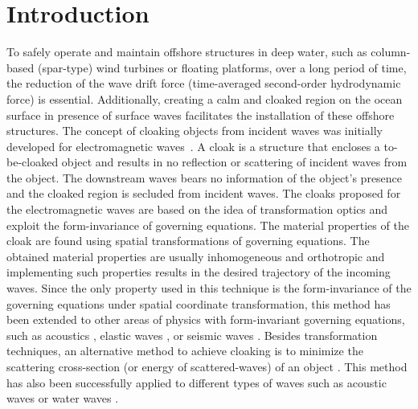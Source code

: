 \documentclass{jfm}
\begin{document}


\section{Introduction}
\label{intr}



{To safely operate and maintain offshore structures in deep water, such as column-based (spar-type) wind turbines or floating platforms, over a long period of time, the reduction of the wave drift force (time-averaged second-order hydrodynamic force) is essential. Additionally, creating a calm and cloaked region on the ocean surface in presence of surface waves facilitates the installation of these offshore structures. 
The concept of cloaking objects from incident waves was initially developed for electromagnetic waves~\cite[]{Pendry2006, Schurig2006}. A cloak is a structure that encloses a to-be-cloaked object and results in no reflection or scattering of incident waves from the object. The downstream waves bears no information of the object's presence and the cloaked region is secluded from incident waves. The cloaks proposed for the electromagnetic waves are based on the idea of transformation optics and exploit the form-invariance of governing equations. The material properties of the cloak are found using spatial transformations of governing equations. The obtained material properties are usually inhomogeneous and orthotropic and implementing such properties results in the desired trajectory of the incoming waves. Since the only property used in this technique is the form-invariance of the governing equations under spatial coordinate transformation, this method has been extended to other areas of physics with form-invariant governing equations, such as acoustics \cite[]{Cummer2007, Chen2007, Huang2014,zareei2018continuous,darabi2018broadband}, elastic waves \cite[]{Farhat2009, Stenger2012,darabi2018experimental,zareei2017broadband}, or seismic waves \cite[]{Brule2014}. Besides transformation techniques, an alternative method to achieve cloaking is to minimize the scattering cross-section (or energy of scattered-waves) of an object \cite[]{alu2005achieving}. This method has also been successfully applied to different types of waves such as acoustic waves \cite[]{guild2011cancellation} or water waves \cite[]{Porter2011, Porter2014}.}
\end{document}
